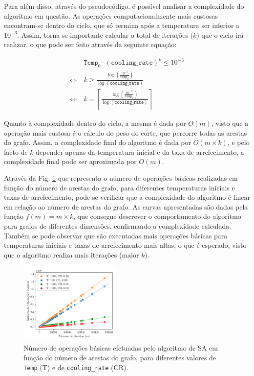 \documentclass[mirror, portugues]{revdetua}
\begin{document}
Para além disso, através do pseudocódigo, é possível analisar a complexidade do algoritmo em questão. As operações computacionalmente mais custosas encontram-se dentro do ciclo, que só termina após a temperatura ser inferior a $10^{-3}$. Assim, torna-se importante calcular o total de iterações ($k$) que o ciclo irá realizar, o que pode ser feito através da seguinte equação:

\begin{align*}
    &\texttt{Temp}_0 \cdot (\texttt{cooling\_rate})^k \le 10^{-3} \\
    \Leftrightarrow\ &  k \geq  \frac{\log\left(\frac{10^{-3}}{\texttt{Temp}_0}\right)}{\log(\texttt{cooling\_rate})} \\
    \Leftrightarrow\ & k = \left\lceil \frac{\log\left(\frac{10^{-3}}{\texttt{Temp}_0}\right)}{\log(\texttt{cooling\_rate})} \right\rceil
\end{align*}

\noindent Quanto à complexidade dentro do ciclo, a mesma é dada por $O(m)$, visto que a operação mais custosa é o cálculo do peso do corte, que percorre todas as arestas do grafo. Assim, a complexidade final do algoritmo é dada por $O(m \times k)$, e pelo facto de $k$ depender apenas da temperatura inicial e da taxa de arrefecimento, a complexidade final pode ser aproximada por $O(m)$.

Através da Fig. \ref{fig:sa_ops} que representa o número de operações básicas realizadas em função do número de arestas do grafo, para diferentes temperaturas iniciais e taxas de arrefecimento, pode-se verificar que a complexidade do algoritmo é linear em relação ao número de arestas do grafo. As curvas apresentadas são dadas pela função $f(m) = m \times k$, que consegue descrever o comportamento do algoritmo para grafos de diferentes dimensões, confirmando a complexidade calculada. Também se pode observar que são executadas mais operações básicas para temperaturas iniciais e taxas de arrefecimento mais altas, o que é esperado, visto que o algoritmo realiza mais iterações (maior $k$).

\begin{figure}[H]
    \centering
    \includegraphics[width=0.45\textwidth]{../assets/ops_Simulated .png}
    \caption{Número de operações básicas efetuadas pelo algoritmo de SA em função do número de arestas do grafo, para diferentes valores de \texttt{Temp} (T) e de \texttt{cooling\_rate} (CR).}
    \label{fig:sa_ops}
\end{figure}
\end{document}
